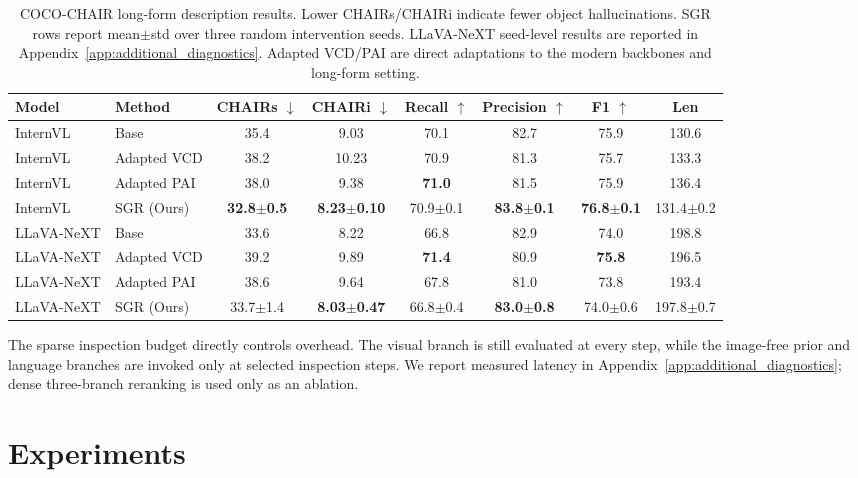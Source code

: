 \documentclass[11pt]{article}
\begin{document}
  \begin{table}[!t]
    \centering
    \small
    \setlength{\tabcolsep}{3.6pt}
    \begin{tabular}{llcccccc}
    \hline
    Model & Method & CHAIRs $\downarrow$ & CHAIRi $\downarrow$ & Recall $\uparrow$ & Precision $\uparrow$ & F1 $\uparrow$ & Len \\
    \hline
    InternVL & Base & 35.4 & 9.03 & 70.1 & 82.7 & 75.9 & 130.6 \\
    InternVL & Adapted VCD & 38.2 & 10.23 & 70.9 & 81.3 & 75.7 & 133.3 \\
    InternVL & Adapted PAI & 38.0 & 9.38 & \textbf{71.0} & 81.5 & 75.9 & 136.4 \\
    InternVL & SGR (Ours) & \textbf{32.8$\pm$0.5} & \textbf{8.23$\pm$0.10} & 70.9$\pm$0.1 & \textbf{83.8$\pm$0.1} & \textbf{76.8$\pm$0.1} & 131.4$\pm$0.2 \\
    \hline
    LLaVA-NeXT & Base & 33.6 & 8.22 & 66.8 & 82.9 & 74.0 & 198.8 \\
    LLaVA-NeXT & Adapted VCD & 39.2 & 9.89 & \textbf{71.4} & 80.9 & \textbf{75.8} & 196.5 \\
    LLaVA-NeXT & Adapted PAI & 38.6 & 9.64 & 67.8 & 81.0 & 73.8 & 193.4 \\
    LLaVA-NeXT & SGR (Ours) & 33.7$\pm$1.4 & \textbf{8.03$\pm$0.47} & 66.8$\pm$0.4 & \textbf{83.0$\pm$0.8} & 74.0$\pm$0.6 & 197.8$\pm$0.7 \\
    \hline
    \end{tabular}
    \caption{
    COCO-CHAIR long-form description results.
    Lower CHAIRs/CHAIRi indicate fewer object hallucinations.
    SGR rows report mean$\pm$std over three random intervention seeds.
    LLaVA-NeXT seed-level results are reported in Appendix~\ref{app:additional_diagnostics}.
    Adapted VCD/PAI are direct adaptations to the modern backbones and long-form setting.
    }
    \label{tab:chair_main}
  \end{table}

  The sparse inspection budget directly controls overhead. The visual branch is still evaluated at every step, while the image-free prior and language branches are invoked only at selected inspection steps.
  We report measured latency in Appendix~\ref{app:additional_diagnostics}; dense three-branch reranking is used only as an ablation.

\section{Experiments}
\end{document}
